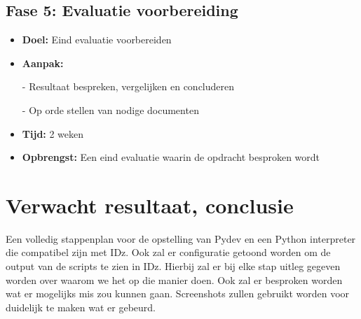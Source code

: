 \subsection{Fase 5: Evaluatie voorbereiding}
\begin{itemize}
    \item \textbf{Doel:}
    Eind evaluatie voorbereiden
    \item \textbf{Aanpak:}
    \item[-] Resultaat bespreken, vergelijken en concluderen
    \item[-] Op orde stellen van nodige documenten
    \item \textbf{Tijd:} 2 weken
    \item \textbf{Opbrengst:}
    Een eind evaluatie waarin de opdracht besproken wordt
\end{itemize}


\section{Verwacht resultaat, conclusie}%
\label{sec:verwachte_resultaten}
Een volledig stappenplan voor de opstelling van Pydev en een Python interpreter die compatibel zijn met IDz. Ook zal er configuratie getoond worden om de output van de scripts te zien in IDz. Hierbij zal er bij elke stap uitleg gegeven worden over waarom we het op die manier doen. Ook zal er besproken worden wat er mogelijks mis zou kunnen gaan. Screenshots zullen gebruikt worden voor duidelijk te maken wat er gebeurd.


 